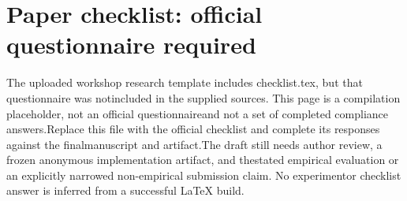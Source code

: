 \section*{Paper checklist: official questionnaire required}
\noindent
The uploaded workshop research template includes checklist.tex, but that questionnaire was not\linebreak[4]
included in the supplied sources. This page is a compilation placeholder, not an official questionnaire\linebreak[4]
and not a set of completed compliance answers.\linebreak[4]
[TODO] Replace this file with the official checklist and complete its responses against the final\linebreak[4]
manuscript and artifact.\linebreak[4]
[TODO] The draft still needs author review, a frozen anonymous implementation artifact, and the\linebreak[4]
stated empirical evaluation or an explicitly narrowed non-empirical submission claim. No experiment\linebreak[4]
or checklist answer is inferred from a successful LaTeX build.\par

